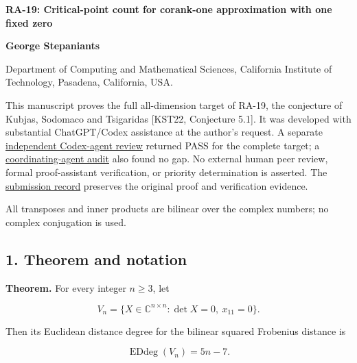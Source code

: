 \documentclass[10pt,a4paper]{article}
\begin{document}
{\raggedright\Large\bfseries RA-19: Critical-point count for corank-one
approximation with one fixed zero\par}
\vspace{0.4em}
{\normalsize\bfseries George Stepaniants\par}
{\small Department of Computing and Mathematical Sciences, California
Institute of Technology, Pasadena, California, USA.\par}
\vspace{0.6em}
\pagestyle{plain}
\setlength{\abovedisplayskip}{6pt}
\setlength{\belowdisplayskip}{6pt}
\setlength{\abovedisplayshortskip}{4pt}
\setlength{\belowdisplayshortskip}{4pt}

This manuscript proves the full all-dimension target of RA-19, the
conjecture of Kubjas, Sodomaco and Tsigaridas {[}KST22, Conjecture
5.1{]}. It was developed with substantial ChatGPT/Codex assistance at
the author's request. A separate
\href{https://github.com/ajt60gaibb/OpenProblemsInNLA/blob/main/references/stepaniants-ra19-2026-09-11/verification/independent-review/review.md}{independent
Codex-agent review} returned PASS for the complete target; a
\href{https://github.com/ajt60gaibb/OpenProblemsInNLA/blob/main/references/stepaniants-ra19-2026-09-11/verification/RA-19-root-math-review.md}{coordinating-agent
audit} also found no gap. No external human peer review, formal
proof-assistant verification, or priority determination is asserted. The
\href{https://github.com/ajt60gaibb/OpenProblemsInNLA/blob/main/references/stepaniants-ra19-2026-09-11/README.md}{submission
record} preserves the original proof and verification evidence.

All transposes and inner products are bilinear over the complex numbers;
no complex conjugation is used.

\subsection{1. Theorem and notation}\label{theorem-and-notation}

\textbf{Theorem.} For every integer \(n\ge3\), let

\nopagebreak[4]

\[V_n=\{X\in\mathbb C^{n\times n}:\det X=0,\ x_{11}=0\}.\]

Then its Euclidean distance degree for the bilinear squared Frobenius
distance is

\nopagebreak[4]

\[\operatorname{EDdeg}(V_n)=5n-7.\]
\end{document}
